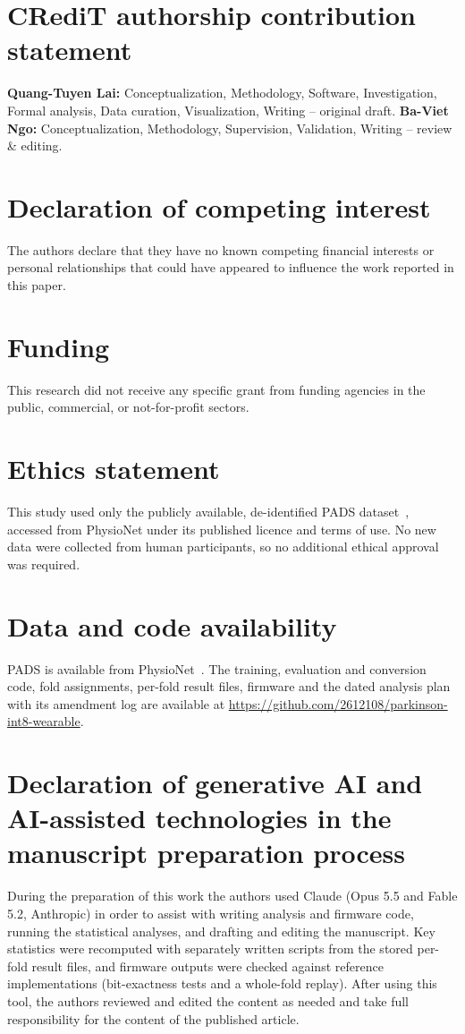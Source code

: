 \documentclass[preprint,12pt]{elsarticle}
\begin{document}
\section*{CRediT authorship contribution statement}
\textbf{Quang-Tuyen Lai:} Conceptualization, Methodology, Software, Investigation, Formal analysis, Data curation, Visualization, Writing -- original draft. \textbf{Ba-Viet Ngo:} Conceptualization, Methodology, Supervision, Validation, Writing -- review \& editing.

\section*{Declaration of competing interest}
The authors declare that they have no known competing financial interests or personal relationships that could have appeared to influence the work reported in this paper.

\section*{Funding}
This research did not receive any specific grant from funding agencies in the public, commercial, or not-for-profit sectors.

\section*{Ethics statement}
This study used only the publicly available, de-identified PADS dataset~\cite{PADSdata}, accessed from PhysioNet under its published licence and terms of use. No new data were collected from human participants, so no additional ethical approval was required.

\section*{Data and code availability}
PADS is available from PhysioNet~\cite{PADSdata}. The training, evaluation and conversion code, fold assignments, per-fold result files, firmware and the dated analysis plan with its amendment log are available at \url{https://github.com/2612108/parkinson-int8-wearable}.

\section*{Declaration of generative AI and AI-assisted technologies in the manuscript preparation process}
During the preparation of this work the authors used Claude (Opus 5.5 and Fable 5.2, Anthropic) in order to assist with writing analysis and firmware code, running the statistical analyses, and drafting and editing the manuscript. Key statistics were recomputed with separately written scripts from the stored per-fold result files, and firmware outputs were checked against reference implementations (bit-exactness tests and a whole-fold replay). After using this tool, the authors reviewed and edited the content as needed and take full responsibility for the content of the published article.



\end{document}
